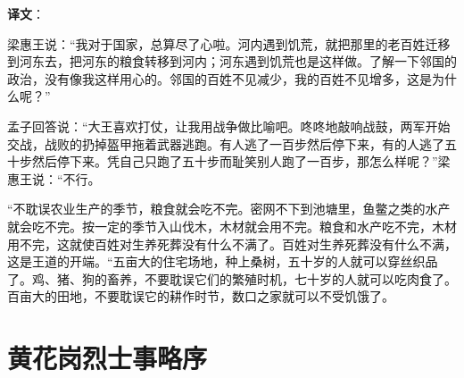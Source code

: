 \documentclass[12pt,UTF-8,openany]{ctexbook}
\begin{document}
\newpage

\textbf{译文}：

\vspace{1em}

\begin{normalsize}
    
    梁惠王说：“我对于国家，总算尽了心啦。河内遇到饥荒，就把那里的老百姓迁移到河东去，把河东的粮食转移到河内；河东遇到饥荒也是这样做。了解一下邻国的政治，没有像我这样用心的。邻国的百姓不见减少，我的百姓不见增多，这是为什么呢？”
    
    孟子回答说：“大王喜欢打仗，让我用战争做比喻吧。咚咚地敲响战鼓，两军开始交战，战败的扔掉盔甲拖着武器逃跑。有人逃了一百步然后停下来，有的人逃了五十步然后停下来。凭自己只跑了五十步而耻笑别人跑了一百步，那怎么样呢？”梁惠王说：“不行。
    
    “不耽误农业生产的季节，粮食就会吃不完。密网不下到池塘里，鱼鳖之类的水产就会吃不完。按一定的季节入山伐木，木材就会用不完。粮食和水产吃不完，木材用不完，这就使百姓对生养死葬没有什么不满了。百姓对生养死葬没有什么不满，这是王道的开端。“五亩大的住宅场地，种上桑树，五十岁的人就可以穿丝织品了。鸡、猪、狗的畜养，不要耽误它们的繁殖时机，七十岁的人就可以吃肉食了。百亩大的田地，不要耽误它的耕作时节，数口之家就可以不受饥饿了。
    
\end{normalsize}



\chapter{黄花岗烈士事略序}
\end{document}

